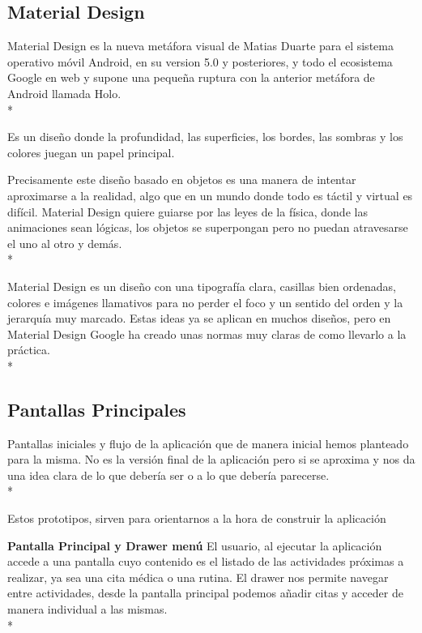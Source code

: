 \documentclass[../pfc.tex]{subfiles}
\begin{document}
		\subsection{Material Design}
		Material Design es la nueva metáfora visual de Matias Duarte para el sistema operativo móvil Android, en su version 5.0 y posteriores, y todo el ecosistema Google en web y supone una pequeña ruptura con la anterior metáfora de Android llamada Holo. \\*
		
		Es un diseño donde la profundidad, las superficies, los bordes, las sombras y los colores juegan un papel principal.
		
		Precisamente este diseño basado en objetos es una manera de intentar aproximarse a la realidad, algo que en un mundo donde todo es táctil y virtual es difícil. Material Design quiere guiarse por las leyes de la física, donde las animaciones sean lógicas, los objetos se superpongan pero no puedan atravesarse el uno al otro y demás.\\*
		
		Material Design es un diseño con una tipografía clara, casillas bien ordenadas, colores e imágenes llamativos para no perder el foco y un sentido del orden y la jerarquía muy marcado. Estas ideas ya se aplican en muchos diseños, pero en Material Design Google ha creado unas normas muy claras de como llevarlo a la práctica.\\*
		
		\subsection{Pantallas Principales}
		
			Pantallas iniciales y flujo de la aplicación que de manera inicial hemos planteado para la misma.
			No es la versión final de la aplicación pero si se aproxima y nos da una idea clara de lo que debería ser o a lo que debería parecerse.\\*
			
			Estos prototipos, sirven para orientarnos a la hora de construir la aplicación
			
			\textbf{Pantalla Principal y Drawer menú}
			El usuario, al ejecutar la aplicación accede a una pantalla cuyo contenido es el listado de las actividades próximas a realizar, ya sea una cita médica o una rutina.
			El drawer nos permite navegar entre actividades, desde la pantalla principal podemos añadir citas y acceder de manera individual a las mismas.\\*
			 
\end{document}
